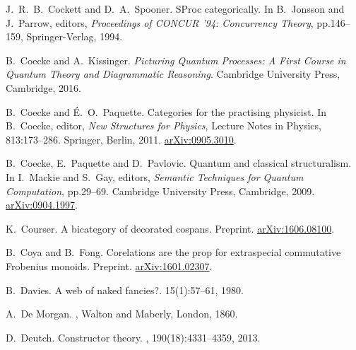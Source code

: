 \begin{thebibliography}{RSW00}

    J.\ R.\ B.\ Cockett and D.\ A.\ Spooner.
    \newblock SProc categorically.
    \newblock In B.\ Jonsson and J.\ Parrow, editors, {\sl Proceedings of CONCUR
    '94: Concurrency Theory}, pp.146--159, Springer-Verlag, 1994.
    
    B.\ Coecke and A.\ Kissinger.
    \newblock \textsl{Picturing Quantum Processes: A First Course in Quantum
    Theory and Diagrammatic Reasoning}.
    \newblock Cambridge University Press, Cambridge, 2016.

    B.\ Coecke and \'E.\ O.\ Paquette.
    \newblock Categories for the practising physicist.
    \newblock In B.\ Coecke, editor, {\sl New Structures for Physics},
    Lecture Notes in Physics, 813:173--286.
    \newblock Springer, Berlin, 2011.
    \newblock \href{http://arxiv.org/abs/0905.3010}{arXiv:0905.3010}.

    B.\ Coecke, E.\ Paquette and D.\ Pavlovic.
    \newblock Quantum and classical structuralism.
    \newblock In I.\ Mackie and S.\ Gay, editors, \textsl{Semantic Techniques for Quantum
    Computation}, pp.29--69. Cambridge University Press, Cambridge, 2009.
    \newblock \href{http://arxiv.org/abs/0904.1997}{arXiv:0904.1997}.

    K.\ Courser.
    \newblock A bicategory of decorated cospans.
    \newblock Preprint. 
    \newblock \href{http://arxiv.org/abs/1606.08100}{arXiv:1606.08100}.

    B.\ Coya and B.\ Fong.
    \newblock Corelations are the prop for extraspecial commutative Frobenius
    monoids.
    \newblock Preprint.
    \newblock \href{http://arxiv.org/abs/1601.02307}{arXiv:1601.02307}.

    B.\ Davies.
    \newblock A web of naked fancies?.
     { 15}(1):57--61, 1980.
    
    A.\ De Morgan.
    , Walton and Maberly,
    London, 1860.

    D.\ Deutch.
    \newblock Constructor theory.
    , 190(18):4331--4359, 2013.
    



\end{thebibliography}
